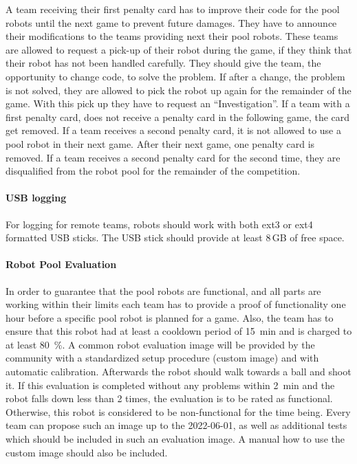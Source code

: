            A team receiving their first penalty card has to improve their code for the pool robots until the next game to prevent future damages. They have to announce their modifications to the teams providing next their pool robots. These teams are allowed to request a pick-up of their robot during the game, if they think that their robot has not been handled carefully. They should give the team, the opportunity to change code, to solve the problem. If after a change, the problem is not solved, they are allowed to pick the robot up again for the remainder of the game. With this pick up they have to request an ``Investigation''.
            If a team with a first penalty card, does not receive a penalty card in the following game, the card get removed.
            If a team receives a second penalty card, it is not allowed to use a pool robot in their next game. After their next game, one penalty card is removed.
            If a team receives a second penalty card for the second time, they are disqualified from the robot pool for the remainder of the competition.

        \paragraph{USB logging}
            For logging for remote teams, robots should work with both ext3 or ext4 formatted USB sticks. The USB stick should provide at least 8\,GB of free space.

        \paragraph{Robot Pool Evaluation}
            \label{sec:robot_pool_evaluation}
            In order to guarantee that the pool robots are functional, and all parts are working within their limits each team has to provide a proof of functionality one hour before a specific pool robot is planned for a game. Also, the team has to ensure that this robot had at least a cooldown period of \qty{15}{\minute} and is charged to at least \qty{80}{\percent}.
            A common robot evaluation image will be provided by the community with a standardized setup procedure (custom image) and with automatic calibration. Afterwards the robot should walk towards a ball and shoot it. If this evaluation is completed without any problems within \qty{2}{\minute} and the robot falls down less than 2 times, the evaluation is to be rated as functional. Otherwise, this robot is considered to be non-functional for the time being. Every team can propose such an image up to the 2022-06-01, as well as additional tests which should be included in such an evaluation image. A manual how to use the custom image should also be included.

